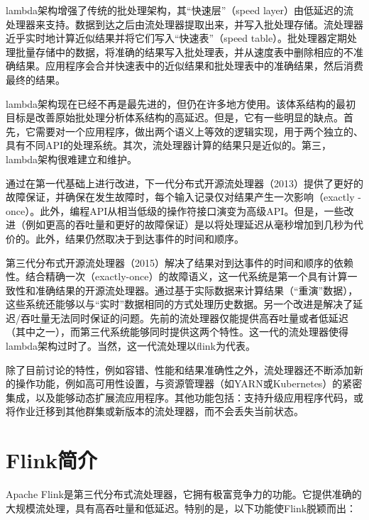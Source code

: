 \documentclass[cn,11pt,chinese]{elegantbook}
\begin{document}
lambda架构增强了传统的批处理架构，其“快速层”（speed layer）由低延迟的流处理器来支持。数据到达之后由流处理器提取出来，并写入批处理存储。流处理器近乎实时地计算近似结果并将它们写入“快速表”（speed table）。批处理器定期处理批量存储中的数据，将准确的结果写入批处理表，并从速度表中删除相应的不准确结果。应用程序会合并快速表中的近似结果和批处理表中的准确结果，然后消费最终的结果。

lambda架构现在已经不再是最先进的，但仍在许多地方使用。该体系结构的最初目标是改善原始批处理分析体系结构的高延迟。但是，它有一些明显的缺点。首先，它需要对一个应用程序，做出两个语义上等效的逻辑实现，用于两个独立的、具有不同API的处理系统。其次，流处理器计算的结果只是近似的。第三，lambda架构很难建立和维护。

通过在第一代基础上进行改进，下一代分布式开源流处理器（2013）提供了更好的故障保证，并确保在发生故障时，每个输入记录仅对结果产生一次影响（exactly -once）。此外，编程API从相当低级的操作符接口演变为高级API。但是，一些改进（例如更高的吞吐量和更好的故障保证）是以将处理延迟从毫秒增加到几秒为代价的。此外，结果仍然取决于到达事件的时间和顺序。

第三代分布式开源流处理器（2015）解决了结果对到达事件的时间和顺序的依赖性。结合精确一次（exactly-once）的故障语义，这一代系统是第一个具有计算一致性和准确结果的开源流处理器。通过基于实际数据来计算结果（“重演”数据），这些系统还能够以与“实时”数据相同的方式处理历史数据。另一个改进是解决了延迟/吞吐量无法同时保证的问题。先前的流处理器仅能提供高吞吐量或者低延迟（其中之一），而第三代系统能够同时提供这两个特性。这一代的流处理器使得lambda架构过时了。当然，这一代流处理以flink为代表。

除了目前讨论的特性，例如容错、性能和结果准确性之外，流处理器还不断添加新的操作功能，例如高可用性设置，与资源管理器（如YARN或Kubernetes）的紧密集成，以及能够动态扩展流应用程序。其他功能包括：支持升级应用程序代码，或将作业迁移到其他群集或新版本的流处理器，而不会丢失当前状态。

\section{Flink简介}

Apache Flink是第三代分布式流处理器，它拥有极富竞争力的功能。它提供准确的大规模流处理，具有高吞吐量和低延迟。特别的是，以下功能使Flink脱颖而出：
\end{document}
